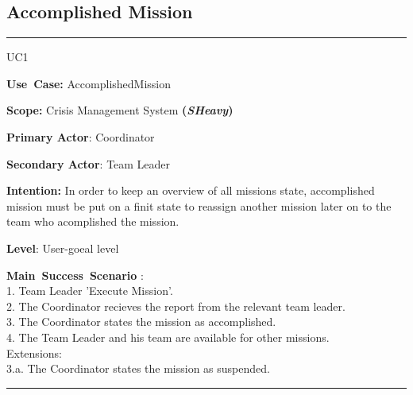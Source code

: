\subsection{Accomplished Mission}
\vspace{0.5cm}
\hrule
\vspace{0.5cm}
\begin{lyxlist}{UC1}
\small{
\item [\textbf{Use~Case:}] AccomplishedMission
\item [\textbf{Scope:}] Crisis Management System \textbf{(\emph{SHeavy})}
\item [\textbf{Primary Actor}:] Coordinator
\item [\textbf{Secondary Actor}:] Team Leader
\item [\textbf{Intention:}] In order to keep an overview of all missions state,
accomplished mission must be put on a finit state to reassign another mission
later on to the team who acomplished the mission.
\item [\textbf{Level}:]User-goeal level
\item [\textbf{Main~Success~Scenario}]:\\
1. Team Leader 'Execute Mission'.\\
2. The Coordinator recieves the report from the relevant team leader.\\
3. The Coordinator states the mission as accomplished.\\
4. The Team Leader and his team are available for other missions.\\
Extensions:\\
	3.a. The Coordinator states the mission as suspended.\\
}
\end{lyxlist}
\hrule 
\vspace{0.5cm} 


